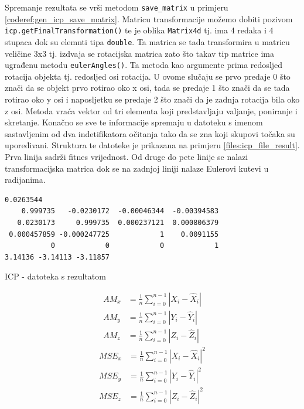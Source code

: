 Spremanje rezultata se vrši metodom \texttt{save_matrix} u primjeru \ref{coderef:gen_icp_save_matrix}. Matricu transformacije možemo dobiti pozivom \texttt{icp.getFinalTransformation()} te je  oblika \texttt{Matrix4d} tj. ima 4 redaka i 4 stupaca dok su elemnti tipa \texttt{double}. Ta matrica se tada transformira u matricu veličine 3x3 tj. izdvaja se rotacijska matrica zato što takav tip matrice ima ugrađenu metodu \texttt{eulerAngles()}. Ta metoda kao argumente prima redosljed rotacija objekta tj. redosljed osi rotacija. U ovome slučaju se prvo predaje 0 što znači da se objekt prvo rotirao oko x osi, tada se predaje 1 što znači da se tada rotirao oko y osi i naposljetku se predaje 2 što znači da je zadnja rotacija bila oko z osi. Metoda vraća vektor od tri elementa koji predstavljaju valjanje, poniranje i skretanje. Konačno se sve te informacije spremaju u datoteku s imenom sastavljenim od dva indetifikatora očitanja tako da se zna koji skupovi točaka su upoređivani. Struktura te datoteke je prikazana na primjeru  \ref{files:icp_file_result}. Prva linija sadrži fitnes vrijednost. Od druge do pete linije se nalazi transformacijska matrica dok se na zadnjoj liniji nalaze Eulerovi kutevi u radijanima.
\begin{listing}[H]
  \begin{verbatim}
0.0263544
    0.999735   -0.0230172  -0.00046344  -0.00394583
   0.0230173     0.999735  0.000237121  0.000806379
 0.000457859 -0.000247725            1    0.0091155
           0            0            0            1
3.14136 -3.14113 -3.11857
  \end{verbatim}
  \caption{ICP - datoteka s rezultatom}
  \label{files:icp_file_result}
\end{listing}

\begin{equation}
  \begin{aligned}
AM_{x} &= \frac{1}{n}\sum_{i=0}^{n-1} |X_{i} - \hat{X}_{i}|\\
AM_{y} &= \frac{1}{n}\sum_{i=0}^{n-1} |Y_{i} - \hat{Y}_{i}|\\
AM_{z} &= \frac{1}{n}\sum_{i=0}^{n-1} |Z_{i} - \hat{Z}_{i}|
  \end{aligned}
  \label{eq:coord_am}
\end{equation}
\begin{equation}
  \begin{aligned}
MSE_{x} &= \frac{1}{n}\sum_{i=0}^{n-1} |X_{i} - \hat{X}_{i}|^2\\
MSE_{y} &= \frac{1}{n}\sum_{i=0}^{n-1} |Y_{i} - \hat{Y}_{i}|^2\\
MSE_{z} &= \frac{1}{n}\sum_{i=0}^{n-1} |Z_{i} - \hat{Z}_{i}|^2
  \end{aligned}
  \label{eq:coord_mse}
\end{equation}

